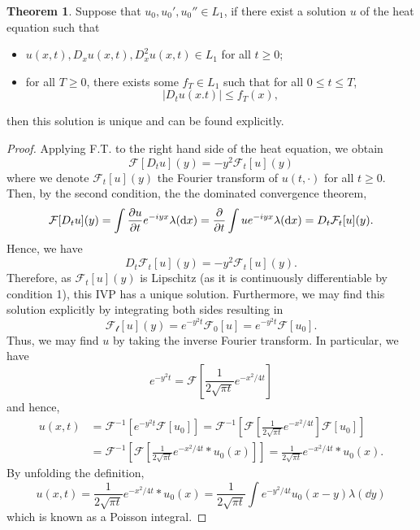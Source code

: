 \documentclass[]{article}
\theoremstyle{definition}
\newtheorem{theorem}{Theorem}
\theoremstyle{definition}
\begin{document}
\begin{theorem}
  Suppose that \(u_0, u_0', u_0'' \in L_1\), if there exist a solution \(u\) of the 
  heat equation such that 
  \begin{itemize}
    \item \(u(x, t), D_x u(x ,t), D^2_x u(x, t) \in L_1\) for all \(t \ge 0\);
    \item for all \(T \ge 0\), there exists some \(f_T \in L_1\) such that 
      for all \(0 \le t \le T\),
      \[|D_t u(x. t)| \le f_T(x),\]
  \end{itemize}
  then this solution is unique and can be found explicitly.
\end{theorem}
\begin{proof}
  Applying F.T. to the right hand side of the heat equation, we obtain 
  \[\mathcal{F}[D_t u](y) = -y^2 \mathcal{F}_t[u](y)\]
  where we denote \(\mathcal{F}_t[u](y)\) the Fourier transform of \(u(t, \cdot)\) 
  for all \(t \ge 0\). Then, by the second condition, the the dominated 
  convergence theorem, 
  \[\mathcal{F}[D_t u](y) = \int \pdv{u}{t} e^{-iyx} \lambda(\dd x) 
    = \pdv{t} \int ue^{-iy x} \lambda(\dd x) = D_t \mathcal{F}_t[u](y).\]
  Hence, we have 
  \[D_t \mathcal{F}_t[u](y) = -y^2 \mathcal{F}_t[u](y).\]
  Therefore, as \(\mathcal{F}_t[u](y)\) is Lipschitz (as it is continuously 
  differentiable by condition 1), this IVP has a unique solution. Furthermore, 
  we may find this solution explicitly by integrating both sides resulting in 
  \[\mathcal{F_t}[u](y) = e^{-y^2 t}\mathcal{F}_0[u] = e^{-y^2 t}\mathcal{F}[u_0].\]
  Thus, we may find \(u\) by taking the inverse Fourier transform. In particular, 
  we have 
  \[e^{-y^2 t} = \mathcal{F}\left[\frac{1}{2\sqrt{\pi t}} e^{-x^2 / 4t}\right]\]
  and hence, 
  \[\begin{split}
    u(x, t) & = \mathcal{F}^{-1}[e^{-y^2 t}\mathcal{F}[u_0]] = 
    \mathcal{F}^{-1}\left[\mathcal{F}\left[\frac{1}{2\sqrt{\pi t}} e^{-x^2 / 4t}\right]\mathcal{F}[u_0]\right]\\
    & = \mathcal{F}^{-1}\left[\mathcal{F}\left[\frac{1}{2\sqrt{\pi t}} e^{-x^2 / 4t} * u_0(x)\right]\right]
      = \frac{1}{2\sqrt{\pi t}} e^{-x^2 / 4t} * u_0(x).
  \end{split}\]
  By unfolding the definition, 
  \[u(x, t) = \frac{1}{2\sqrt{\pi t}} e^{-x^2 / 4t} * u_0(x) 
  = \frac{1}{2\sqrt{\pi t}} \int e^{- y^2 / 4t}u_0(x - y) \lambda(\dd y)\]
  which is known as a Poisson integral.
\end{proof}
\end{document}

